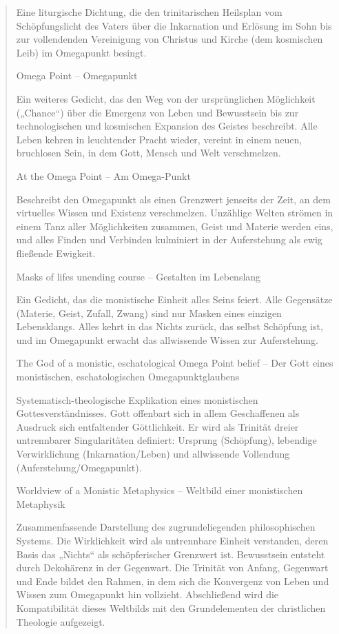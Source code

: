 \documentclass[
  ngerman,
]{article}
\begin{document}
\begin{quote}
Eine liturgische Dichtung, die den trinitarischen Heilsplan vom
Schöpfungslicht des Vaters über die Inkarnation und Erlösung im Sohn bis
zur vollendenden Vereinigung von Christus und Kirche (dem kosmischen
Leib) im Omegapunkt besingt.

Omega Point -- Omegapunkt

Ein weiteres Gedicht, das den Weg von der ursprünglichen Möglichkeit
(„Chance``) über die Emergenz von Leben und Bewusstsein bis zur
technologischen und kosmischen Expansion des Geistes beschreibt. Alle
Leben kehren in leuchtender Pracht wieder, vereint in einem neuen,
bruchlosen Sein, in dem Gott, Mensch und Welt verschmelzen.

At the Omega Point -- Am Omega-Punkt

Beschreibt den Omegapunkt als einen Grenzwert jenseits der Zeit, an dem
virtuelles Wissen und Existenz verschmelzen. Unzählige Welten strömen in
einem Tanz aller Möglichkeiten zusammen, Geist und Materie werden eins,
und alles Finden und Verbinden kulminiert in der Auferstehung als ewig
fließende Ewigkeit.

Masks of life\textquotesingle s unending course -- Gestalten im
Lebenslang

Ein Gedicht, das die monistische Einheit alles Seins feiert. Alle
Gegensätze (Materie, Geist, Zufall, Zwang) sind nur Masken eines
einzigen Lebensklangs. Alles kehrt in das Nichts zurück, das selbst
Schöpfung ist, und im Omegapunkt erwacht das allwissende Wissen zur
Auferstehung.

The God of a monistic, eschatological Omega Point belief -- Der Gott
eines monistischen, eschatologischen Omegapunktglaubens

Systematisch-theologische Explikation eines monistischen
Gottesverständnisses. Gott offenbart sich in allem Geschaffenen als
Ausdruck sich entfaltender Göttlichkeit. Er wird als Trinität dreier
untrennbarer Singularitäten definiert: Ursprung (Schöpfung), lebendige
Verwirklichung (Inkarnation/Leben) und allwissende Vollendung
(Auferstehung/Omegapunkt).

Worldview of a Monistic Metaphysics -- Weltbild einer monistischen
Metaphysik

Zusammenfassende Darstellung des zugrundeliegenden philosophischen
Systems. Die Wirklichkeit wird als untrennbare Einheit verstanden, deren
Basis das „Nichts`` als schöpferischer Grenzwert ist. Bewusstsein
entsteht durch Dekohärenz in der Gegenwart. Die Trinität von Anfang,
Gegenwart und Ende bildet den Rahmen, in dem sich die Konvergenz von
Leben und Wissen zum Omegapunkt hin vollzieht. Abschließend wird die
Kompatibilität dieses Weltbilds mit den Grundelementen der christlichen
Theologie aufgezeigt.
\end{quote}
\end{document}
